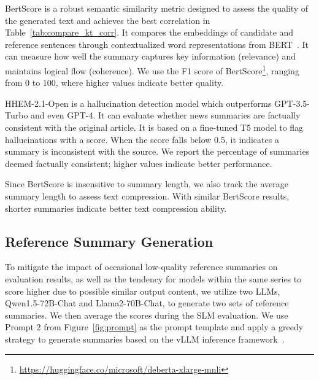 BertScore is a robust semantic similarity metric designed to assess the quality of the generated text and achieves the best correlation in Table~\ref{tab:compare_kt_corr}. It compares the embeddings of candidate and reference sentences through contextualized word representations from BERT~\cite{devlin-etal-2019-bert}. It can measure how well the summary captures key information (relevance) and maintains logical flow (coherence). We use the F1 score of BertScore\footnote{\url{https://huggingface.co/microsoft/deberta-xlarge-mnli}}, ranging from 0 to 100, where higher values indicate better quality.

HHEM-2.1-Open is a hallucination detection model which outperforms GPT-3.5-Turbo and even GPT-4. It can evaluate whether news summaries are factually consistent with the original article. It is based on a fine-tuned T5 model to flag hallucinations with a score. When the score falls below 0.5, it indicates a summary is inconsistent with the source. We report the percentage of summaries deemed factually consistent; higher values indicate better performance.

Since BertScore is insensitive to summary length, we also track the average summary length to assess text compression. With similar BertScore results, shorter summaries indicate better text compression ability.


\subsection{Reference Summary Generation}
To mitigate the impact of occasional low-quality reference summaries on evaluation results, as well as the tendency for models within the same series to score higher due to possible similar output content, we utilize two LLMs, Qwen1.5-72B-Chat and Llama2-70B-Chat, to generate two sets of reference summaries. We then average the scores during the SLM evaluation. We use Prompt 2 from Figure~\ref{fig:prompt} as the prompt template and apply a greedy strategy to generate summaries based on the vLLM inference framework~\cite{vllm}.










